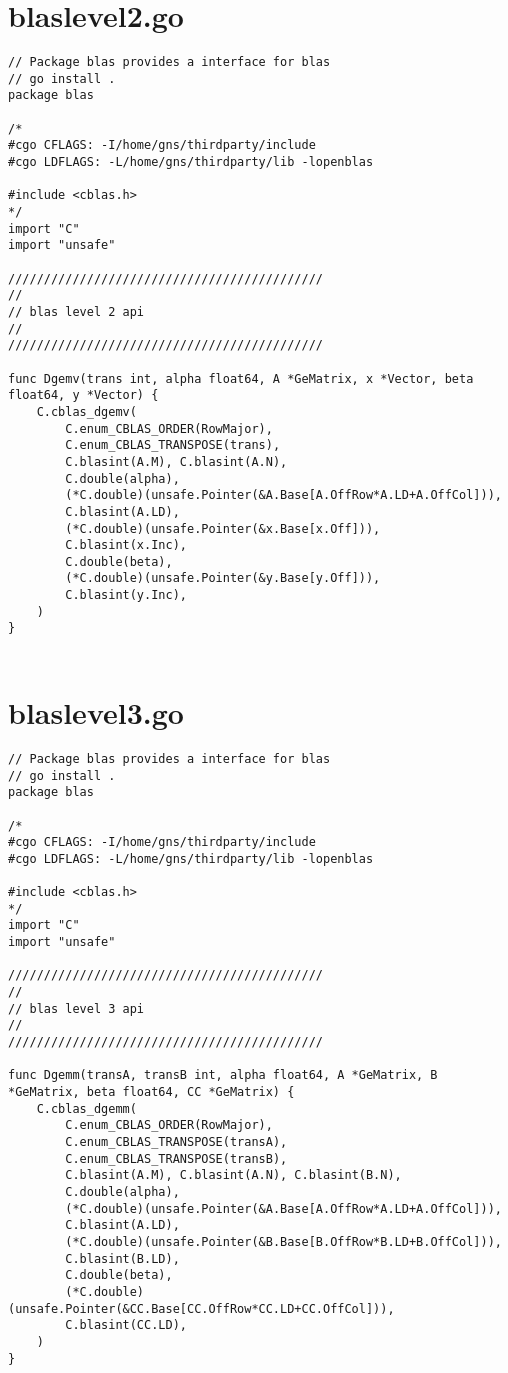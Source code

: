 \documentclass[a5paper,titlepage,landscape,oneside,12pt]{book}
\begin{document}
\chapter{blaslevel2.go}

\begin{lstlisting}
// Package blas provides a interface for blas
// go install .
package blas

/*
#cgo CFLAGS: -I/home/gns/thirdparty/include
#cgo LDFLAGS: -L/home/gns/thirdparty/lib -lopenblas

#include <cblas.h>
*/
import "C"
import "unsafe"

////////////////////////////////////////////
//
// blas level 2 api
//
////////////////////////////////////////////

func Dgemv(trans int, alpha float64, A *GeMatrix, x *Vector, beta float64, y *Vector) {
	C.cblas_dgemv(
		C.enum_CBLAS_ORDER(RowMajor),
		C.enum_CBLAS_TRANSPOSE(trans),
		C.blasint(A.M), C.blasint(A.N),
		C.double(alpha),
		(*C.double)(unsafe.Pointer(&A.Base[A.OffRow*A.LD+A.OffCol])),
		C.blasint(A.LD),
		(*C.double)(unsafe.Pointer(&x.Base[x.Off])),
		C.blasint(x.Inc),
		C.double(beta),
		(*C.double)(unsafe.Pointer(&y.Base[y.Off])),
		C.blasint(y.Inc),
	)
}


\end{lstlisting}

\chapter{blaslevel3.go}

\begin{lstlisting}
// Package blas provides a interface for blas
// go install .
package blas

/*
#cgo CFLAGS: -I/home/gns/thirdparty/include
#cgo LDFLAGS: -L/home/gns/thirdparty/lib -lopenblas

#include <cblas.h>
*/
import "C"
import "unsafe"

////////////////////////////////////////////
//
// blas level 3 api
//
////////////////////////////////////////////

func Dgemm(transA, transB int, alpha float64, A *GeMatrix, B *GeMatrix, beta float64, CC *GeMatrix) {
	C.cblas_dgemm(
		C.enum_CBLAS_ORDER(RowMajor),
		C.enum_CBLAS_TRANSPOSE(transA),
		C.enum_CBLAS_TRANSPOSE(transB),
		C.blasint(A.M), C.blasint(A.N), C.blasint(B.N),
		C.double(alpha),
		(*C.double)(unsafe.Pointer(&A.Base[A.OffRow*A.LD+A.OffCol])),
		C.blasint(A.LD),
		(*C.double)(unsafe.Pointer(&B.Base[B.OffRow*B.LD+B.OffCol])),
		C.blasint(B.LD),
		C.double(beta),
		(*C.double)(unsafe.Pointer(&CC.Base[CC.OffRow*CC.LD+CC.OffCol])),
		C.blasint(CC.LD),
	)
}


\end{lstlisting}
\end{document}
